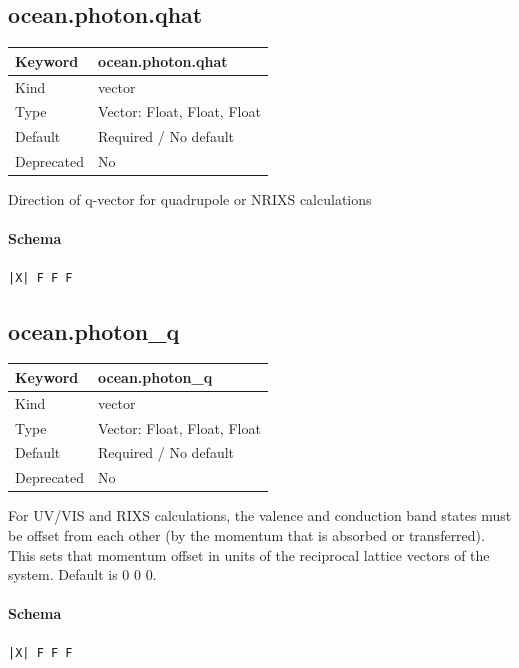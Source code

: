 \documentclass[11pt]{article}
\begin{document}
{{{{{\subsection{ocean.photon.qhat}
\label{kw:ocean-photon-qhat}
\begin{longtable}{|p{1.5in}|p{4.5in}|}
\hline
Keyword & ocean.photon.qhat \\
\hline
Kind & vector \\
\hline
Type & Vector: Float, Float, Float \\
\hline
Default & Required / No default \\
\hline
Deprecated & No \\
\hline
\end{longtable}
 Direction of q-vector for quadrupole or NRIXS calculations

\paragraph{Schema}
\begin{Verbatim}
|X| F F F
\end{Verbatim}

\subsection{ocean.photon\_q}
\label{kw:ocean-photon-q}
\begin{longtable}{|p{1.5in}|p{4.5in}|}
\hline
Keyword & ocean.photon\_q \\
\hline
Kind & vector \\
\hline
Type & Vector: Float, Float, Float \\
\hline
Default & Required / No default \\
\hline
Deprecated & No \\
\hline
\end{longtable}
 For UV/VIS and RIXS calculations, the valence and conduction band states
 must be offset from each other (by the momentum that is absorbed or
 transferred). This sets that momentum offset in units of the reciprocal
 lattice vectors of the system. Default is 0 0 0.

\paragraph{Schema}
\begin{Verbatim}
|X| F F F
\end{Verbatim}

}}}}}
\end{document}
